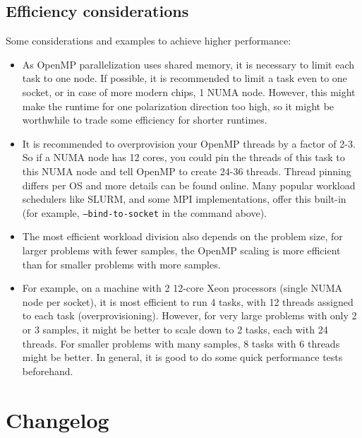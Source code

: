 \documentclass[12pt]{book}
\begin{document}
\subsection{Efficiency considerations}
Some considerations and examples to achieve higher performance:
\begin{itemize}
\item As OpenMP parallelization uses shared memory, it is necessary to limit each task to one node. If possible, it is recommended to limit a task even to one socket, or in case of more modern chips, 1 NUMA node. However, this might make the runtime for one polarization direction too high, so it might be worthwhile to trade some efficiency for shorter runtimes.
\item It is recommended to overprovision your OpenMP threads by a factor of 2-3. So if a NUMA node has 12 cores, you could pin the threads of this task to this NUMA node and tell OpenMP to create 24-36 threads. Thread pinning differs per OS and more details can be found online. Many popular workload schedulers like SLURM, and some MPI implementations, offer this built-in (for example, {\tt --bind-to-socket} in the command above).
\item The most efficient workload division also depends on the problem size, for larger problems with fewer samples, the OpenMP scaling is more efficient than for smaller problems with more samples.
\item For example, on a machine with 2 12-core Xeon processors (single NUMA node per socket), it is most efficient to run 4 tasks, with 12 threads assigned to each task (overprovisioning). However, for very large problems with only 2 or 3 samples, it might be better to scale down to 2 tasks, each with 24 threads. For smaller problems with many samples, 8 tasks with 6 threads might be better. In general, it is good to do some quick performance tests beforehand.
\end{itemize}

\section{Changelog}
\end{document}
